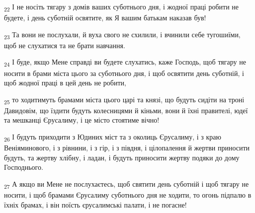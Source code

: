 \begin{tcolorbox}
\textsubscript{22} І не носіть тягару з домів ваших суботнього дня, і жодної праці робити не будете, і день суботній освятите, як Я вашим батькам наказав був!
\end{tcolorbox}
\begin{tcolorbox}
\textsubscript{23} Та вони не послухали, й вуха свого не схилили, і вчинили себе тугошиїми, щоб не слухатися та не брати навчання.
\end{tcolorbox}
\begin{tcolorbox}
\textsubscript{24} І буде, якщо Мене справді ви будете слухатись, каже Господь, щоб тягару не носити в брами міста цього за суботнього дня, і щоб освятити день суботній, і щоб жодної праці в цей день не робити,
\end{tcolorbox}
\begin{tcolorbox}
\textsubscript{25} то ходитимуть брамами міста цього царі та князі, що будуть сидіти на троні Давидовім, що їздити будуть колесницями й кіньми, вони й їхні правителі, юдеї та мешканці Єрусалиму, і це місто стоятиме вічно!
\end{tcolorbox}
\begin{tcolorbox}
\textsubscript{26} І будуть приходити з Юдиних міст та з околиць Єрусалиму, і з краю Веніяминового, і з рівнини, і з гір, і з півдня, і цілопалення й жертви приносити будуть, та жертву хлібну, і ладан, і будуть приносити жертву подяки до дому Господнього.
\end{tcolorbox}
\begin{tcolorbox}
\textsubscript{27} А якщо ви Мене не послухаєтесь, щоб святити день суботній і щоб тягару не носити, і щоб брамами Єрусалиму суботнього дня не ходити, то огонь підпалю в їхніх брамах, і він поїсть єрусалимські палати, і не погасне!
\end{tcolorbox}
